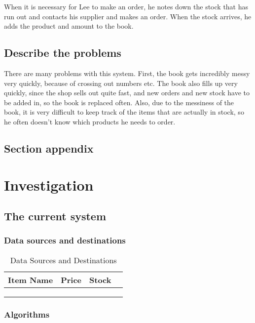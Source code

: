 When it is necessary for Lee to make an order, he notes down the stock that has run out and contacts his supplier and makes an order. When the stock arrives, he adds the product and amount to the book.

\subsection{Describe the problems}
There are many problems with this system. First, the book gets incredibly messy very quickly, because of crossing out numbers etc. The book also fills up very quickly, since the shop sells out quite fast, and new orders and new stock have to be added in, so the book is replaced often. Also, due to the messiness of the book, it is very difficult to keep track of the items that are actually in stock, so he often doesn't know which products he needs to order. 

\subsection{Section appendix}

\section{Investigation}

\subsection{The current system}

\subsubsection{Data sources and destinations}

\begin{table}[]
\centering
\caption{Data Sources and Destinations}
\label{my-label}
\begin{tabular}{|l|l|l|l|}
\hline
 Item Name & Price & Stock \\ \hline
         &           &              \\ \hline
         &           &              \\ \hline
         &           &              \\ \hline
\end{tabular}
\end{table}

\subsubsection{Algorithms}

